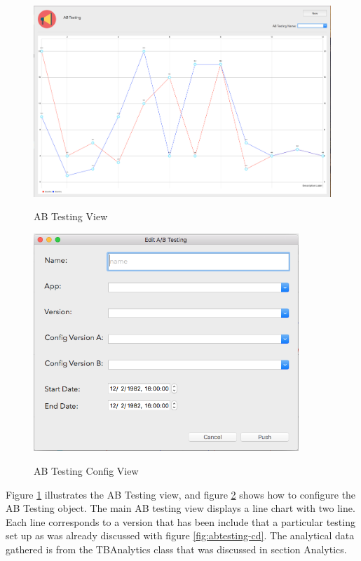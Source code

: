 \begin{figure}[!h]
    \caption{AB Testing View}
    \centering
    \includegraphics[width=120mm]{images/dashboard/abtesting}
    \label{fig:abtesting-view}
\end{figure} 

\begin{figure}[!h]
    \caption{AB Testing Config View}
    \centering
    \includegraphics[width=100mm]{images/dashboard/abtesting-config}
    \label{fig:abtesting-config-view}
\end{figure} 

Figure \ref{fig:abtesting-view} illustrates the AB Testing view, and figure \ref{fig:abtesting-config-view} shows how to configure the AB Testing object. The main AB testing view displays a line chart with two line. Each line corresponds to a version that has been include that a particular testing set up as was already discussed with figure \ref{fig:abtesting-cd}. The analytical data gathered is from the TBAnalytics class that was discussed in section Analytics.

